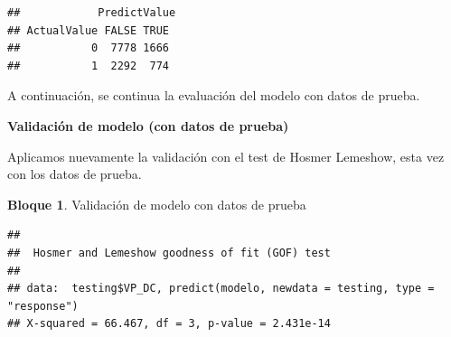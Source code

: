 \documentclass[]{book}
\newenvironment{Shaded}{\begin{snugshade}}{\end{snugshade}}
\newcommand{\CommentTok}[1]{\textcolor[rgb]{0.56,0.35,0.01}{\textit{#1}}}
\newcommand{\DataTypeTok}[1]{\textcolor[rgb]{0.13,0.29,0.53}{#1}}
\newcommand{\DecValTok}[1]{\textcolor[rgb]{0.00,0.00,0.81}{#1}}
\newcommand{\KeywordTok}[1]{\textcolor[rgb]{0.13,0.29,0.53}{\textbf{#1}}}
\newcommand{\NormalTok}[1]{#1}
\newcommand{\OperatorTok}[1]{\textcolor[rgb]{0.81,0.36,0.00}{\textbf{#1}}}
\newcommand{\StringTok}[1]{\textcolor[rgb]{0.31,0.60,0.02}{#1}}
\theoremstyle{definition}
\theoremstyle{definition}
\newtheorem{example}{Bloque}[chapter]
\theoremstyle{definition}
\theoremstyle{definition}
\theoremstyle{remark}
\begin{document}
\begin{Shaded}
\end{Shaded}

\begin{verbatim}
##            PredictValue
## ActualValue FALSE TRUE
##           0  7778 1666
##           1  2292  774
\end{verbatim}

A continuación, se continua la evaluación del modelo con datos de prueba.

\textbf{Validación de modelo (con datos de prueba)}

Aplicamos nuevamente la validación con el test de Hosmer Lemeshow, esta vez con los datos de prueba.

\begin{example}
\protect\hypertarget{exm:bloque87nbm}{}{\label{exm:bloque87nbm} }Validación de modelo con datos de prueba
\end{example}

\begin{Shaded}
\end{Shaded}

\begin{verbatim}
## 
##  Hosmer and Lemeshow goodness of fit (GOF) test
## 
## data:  testing$VP_DC, predict(modelo, newdata = testing, type = "response")
## X-squared = 66.467, df = 3, p-value = 2.431e-14
\end{verbatim}

\begin{Shaded}
\end{Shaded}
\end{document}
